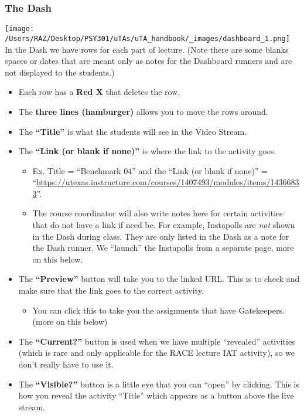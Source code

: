 \documentclass[
]{article}
\providecommand{\tightlist}{%
  \setlength{\itemsep}{0pt}\setlength{\parskip}{0pt}}
\begin{document}
\hypertarget{the-dash}{%
\subsubsection{The Dash}\label{the-dash}}

\texttt{[image: /Users/RAZ/Desktop/PSY301/uTAs/uTA\_handbook/\_images/dashboard\_1.png]}
In the Dash we have rows for each part of lecture. (Note there are some blanks spaces or dates that are meant only as notes for the Dashboard runners and are not displayed to the students.)

\begin{itemize}
\tightlist
\item
  Each row has a \textbf{Red X} that deletes the row.
\item
  The \textbf{three lines (hamburger)} allows you to move the rows around.
\item
  The \textbf{``Title''} is what the students will see in the Video Stream.
\item
  The \textbf{``Link (or blank if none)''} is where the link to the activity goes.

  \begin{itemize}
  \tightlist
  \item
    Ex. Title = ``Benchmark 04'' and the ``Link (or blank if none)'' = ``\url{https://utexas.instructure.com/courses/1407493/modules/items/14366833}''.
  \item
    The course coordinator will also write notes here for certain activities that do not have a link if need be. For example, Instapolls are \emph{not} shown in the Dash during class. They are only listed in the Dash as a note for the Dash runner. We ``launch'' the Instapolls from a separate page, more on this below.
  \end{itemize}
\item
  The \textbf{``Preview''} button will take you to the linked URL. This is to check and make sure that the link goes to the correct activity.

  \begin{itemize}
  \tightlist
  \item
    You can click this to take you the assignments that have Gatekeepers. (more on this below)
  \end{itemize}
\item
  The \textbf{``Current?''} button is used when we have multiple ``revealed'' activities (which is rare and only applicable for the RACE lecture IAT activity), so we don't really have to use it.
\item
  The \textbf{``Visible?''} button is a little eye that you can ``open'' by clicking. This is how you reveal the activity ``Title'' which appears as a button above the live stream.


\end{itemize}
\end{document}
